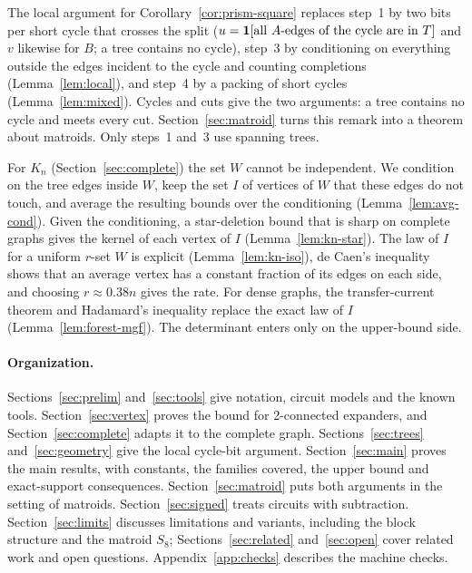 The local argument for Corollary~\ref{cor:prism-square} replaces step~1 by two bits per short cycle that crosses the split ($u=\mathbf{1}[\text{all }A\text{-edges of the cycle are in }T]$ and $v$ likewise for $B$; a tree contains no cycle), step~3 by conditioning on everything outside the edges incident to the cycle and counting completions (Lemma~\ref{lem:local}), and step~4 by a packing of short cycles (Lemma~\ref{lem:mixed}). Cycles and cuts give the two arguments: a tree contains no cycle and meets every cut. Section~\ref{sec:matroid} turns this remark into a theorem about matroids. Only steps~1 and~3 use spanning trees.

For $K_n$ (Section~\ref{sec:complete}) the set $W$ cannot be independent. We condition on the tree edges inside $W$, keep the set $I$ of vertices of $W$ that these edges do not touch, and average the resulting bounds over the conditioning (Lemma~\ref{lem:avg-cond}). Given the conditioning, a star-deletion bound that is sharp on complete graphs gives the kernel of each vertex of $I$ (Lemma~\ref{lem:kn-star}). The law of $I$ for a uniform $r$-set $W$ is explicit (Lemma~\ref{lem:kn-iso}), de Caen's inequality shows that an average vertex has a constant fraction of its edges on each side, and choosing $r\approx0.38n$ gives the rate. For dense graphs, the transfer-current theorem and Hadamard's inequality replace the exact law of $I$ (Lemma~\ref{lem:forest-mgf}). The determinant enters only on the upper-bound side.

\paragraph{Organization.} Sections~\ref{sec:prelim} and~\ref{sec:tools} give notation, circuit models and the known tools. Section~\ref{sec:vertex} proves the bound for 2-connected expanders, and Section~\ref{sec:complete} adapts it to the complete graph. Sections~\ref{sec:trees} and~\ref{sec:geometry} give the local cycle-bit argument. Section~\ref{sec:main} proves the main results, with constants, the families covered, the upper bound and exact-support consequences. Section~\ref{sec:matroid} puts both arguments in the setting of matroids. Section~\ref{sec:signed} treats circuits with subtraction. Section~\ref{sec:limits} discusses limitations and variants, including the block structure and the matroid $S_8$; Sections~\ref{sec:related} and~\ref{sec:open} cover related work and open questions. Appendix~\ref{app:checks} describes the machine checks.
